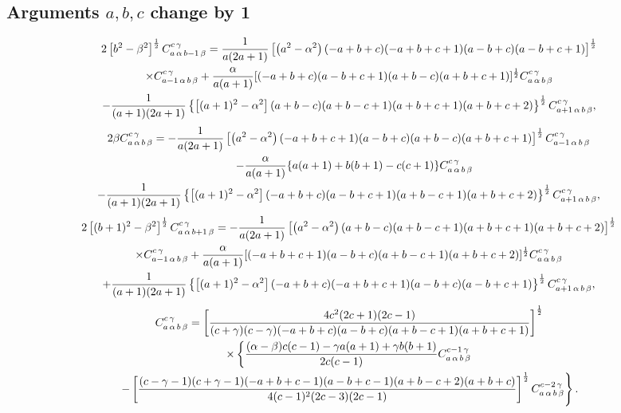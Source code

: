 \subsection{Arguments $a, b, c$ change by 1}\label{sec:8.6.5}
\begin{multline}
 2\left[b^{2}-\beta^{2}\right]^{\frac{1}{2}} C_{a\,\alpha\,b-1\,\beta}^{c\,\gamma}=\frac{1}{a(2 a+1)}\left[\left(a^{2}-\alpha^{2}\right)(-a+b+c)(-a+b+c+1)(a-b+c)(a-b+c+1)\right]^{\frac{1}{2}} \\
\times C_{a-1\,\alpha\,b\,\beta}^{c\,\gamma}+\frac{\alpha}{a(a+1)}[(-a+b+c)(a-b+c+1)(a+b-c)(a+b+c+1)]^{\frac{1}{2}} C_{a\,\alpha\,b\,\beta}^{c\,\gamma}  \\
 -\frac{1}{(a+1)(2 a+1)}\left\{\left[(a+1)^{2}-\alpha^{2}\right](a+b-c)(a+b-c+1)(a+b+c+1)(a+b+c+2)\right\}^{\frac{1}{2}} C_{a+1\,\alpha\,b\,\beta}^{c\,\gamma}, \label{eq:8:6:24}
\end{multline}
\begin{multline}
 2 \beta C_{a\,\alpha\,b\,\beta}^{c\,\gamma}=-\frac{1}{a(2 a+1)}\left[\left(a^{2}-\alpha^{2}\right)(-a+b+c+1)(a-b+c)(a+b-c)(a+b+c+1)\right]^{\frac{1}{2}} C_{a-1\,\alpha\,b\,\beta}^{c\,\gamma} \\
 \quad-\frac{\alpha}{a(a+1)}\{a(a+1)+b(b+1)-c(c+1)\} C_{a\,\alpha\,b\,\beta}^{c\,\gamma}  \\
 -\frac{1}{(a+1)(2 a+1)}\left\{\left[(a+1)^{2}-\alpha^{2}\right](-a+b+c)(a-b+c+1)(a+b-c+1)(a+b+c+2)\right\}^{\frac{1}{2}} C_{a+1\,\alpha\,b\,\beta}^{c\,\gamma}, \label{eq:8:6:25}
\end{multline}
\begin{multline}
2\left[(b+1)^{2}-\beta^{2}\right]^{\frac{1}{2}} C_{a\,\alpha\,b+1\,\beta}^{c\,\gamma}=-\frac{1}{a(2 a+1)}\left[\left(a^{2}-\alpha^{2}\right)(a+b-c)(a+b-c+1)(a+b+c+1)(a+b+c+2)\right]^{\frac{1}{2}} \\
\times C_{a-1\,\alpha\,b\,\beta}^{c\,\gamma}+\frac{\alpha}{a(a+1)}[(-a+b+c+1)(a-b+c)(a+b-c+1)(a+b+c+2)]^{\frac{1}{2}} C_{a\,\alpha\,b\,\beta}^{c\,\gamma}  \\
+\frac{1}{(a+1)(2 a+1)}\left\{\left[(a+1)^{2}-\alpha^{2}\right](-a+b+c)(-a+b+c+1)(a-b+c)(a-b+c+1)\right\}^{\frac{1}{2}} C_{a+1\,\alpha\,b\,\beta}^{c\,\gamma}, \label{eq:8:6:26}\end{multline}
\begin{multline}
C_{a\,\alpha\,b\,\beta}^{c\,\gamma}=\left[\frac{4 c^{2}(2 c+1)(2 c-1)}{(c+\gamma)(c-\gamma)(-a+b+c)(a-b+c)(a+b-c+1)(a+b+c+1)}\right]^{\frac{1}{2}} \\
\times\left\{\frac{(\alpha-\beta) c(c-1)-\gamma a(a+1)+\gamma b(b+1)}{2 c(c-1)} C_{a\,\alpha\,b\,\beta}^{c-1\,\gamma}\right. \\
\left.-\left[\frac{(c-\gamma-1)(c+\gamma-1)(-a+b+c-1)(a-b+c-1)(a+b-c+2)(a+b+c)}{4(c-1)^{2}(2 c-3)(2 c-1)}\right]^{\frac{1}{2}} C_{a\,\alpha\,b\,\beta}^{c-2\,\gamma}\right\} . \label{eq:8:6:27}
\end{multline}
